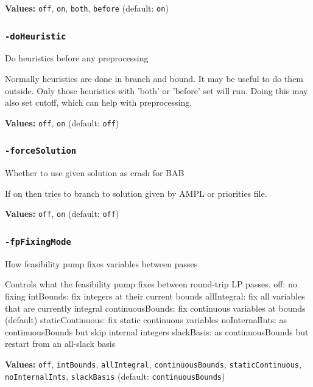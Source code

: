 \documentclass[11pt,a4paper]{article}
\begin{document}
\textbf{Values:} \texttt{off}, \texttt{on}, \texttt{both}, \texttt{before} (default: \texttt{on})

\subsubsection*{\texttt{-doHeuristic}}

Do heuristics before any preprocessing

Normally heuristics are done in branch and bound.  It may be useful to do them outside. Only those heuristics with 'both' or 'before' set will run. Doing this may also set cutoff, which can help with preprocessing.

\textbf{Values:} \texttt{off}, \texttt{on} (default: \texttt{off})

\subsubsection*{\texttt{-forceSolution}}

Whether to use given solution as crash for BAB

If on then tries to branch to solution given by AMPL or priorities file.

\textbf{Values:} \texttt{off}, \texttt{on} (default: \texttt{off})

\subsubsection*{\texttt{-fpFixingMode}}

How feasibility pump fixes variables between passes

Controls what the feasibility pump fixes between round-trip LP passes.
  off: no fixing
  intBounds: fix integers at their current bounds
  allIntegral: fix all variables that are currently integral
  continuousBounds: fix continuous variables at bounds (default)
  staticContinuous: fix static continuous variables
  noInternalInts: as continuousBounds but skip internal integers
  slackBasis: as continuousBounds but restart from an all-slack basis

\textbf{Values:} \texttt{off}, \texttt{intBounds}, \texttt{allIntegral}, \texttt{continuousBounds}, \texttt{staticContinuous}, \texttt{noInternalInts}, \texttt{slackBasis} (default: \texttt{continuousBounds})
\end{document}
